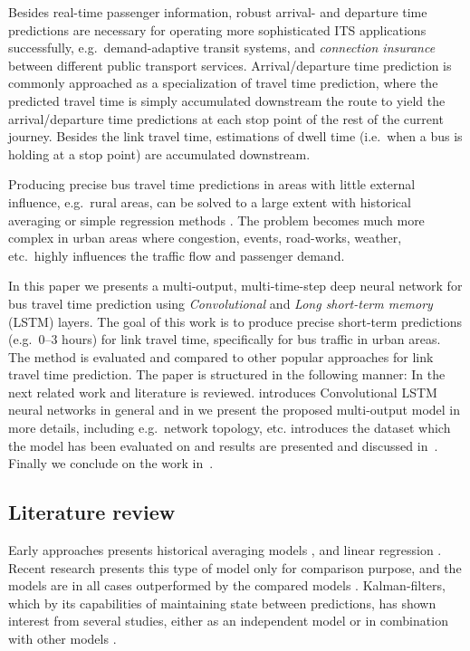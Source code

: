 \documentclass[preprint,12pt]{elsarticle}
\begin{document}
Besides real-time passenger information, robust arrival- and departure time predictions are necessary for operating more sophisticated ITS applications successfully, e.g.\ demand-adaptive transit systems, and \emph{connection insurance} between different public transport services. Arrival/departure time prediction is commonly approached as a specialization of travel time prediction, where the predicted travel time is simply accumulated downstream the route to yield the arrival/departure time predictions at each stop point of the rest of the current journey. Besides the link travel time, estimations of dwell time (i.e.\ when a bus is holding at a stop point) are accumulated downstream.

Producing precise bus travel time predictions in areas with little external influence, e.g.\ rural areas, can be solved to a large extent with historical averaging or simple regression methods \cite{Williams2003,Altinkaya2013}. The problem becomes much more complex in urban areas where congestion, events, road-works, weather, etc.\ highly influences the traffic flow and passenger demand.

In this paper we presents a multi-output, multi-time-step deep neural network for bus travel time prediction using \emph{Convolutional} and \emph{Long short-term memory} (LSTM) \cite{Lstm1,Lstm2} layers. The goal of this work is to produce precise short-term predictions (e.g.\ 0--3 hours) for link travel time, specifically for bus traffic in urban areas. The method is evaluated and compared to other popular approaches for link travel time prediction. The paper is structured in the following manner: In the next related work and literature is reviewed.  introduces Convolutional LSTM neural networks in general and in  we present the proposed multi-output model in more details, including e.g.\ network topology, etc.  introduces the dataset which the model has been evaluated on and results are presented and discussed in~. Finally we conclude on the work in~.

\subsection{Literature review}
Early approaches presents historical averaging models \cite{Dailey1999,Sun2007}, and linear regression \cite{Patnaik2004}. Recent research presents this type of model only for comparison purpose, and the models are in all cases outperformed by the compared models \cite{Shalaby2004,Jeong2005}. Kalman-filters, which by its capabilities of maintaining state between predictions, has shown interest from several studies, either as an independent model \cite{Chen2001,Shalaby2004} or in combination with other models \cite{Zaki2013,Bai2015}. 
\end{document}
